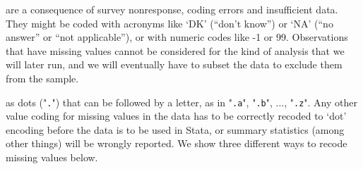  are a consequence of survey nonresponse, coding errors and insufficient data. They might be coded with acronyms like `DK' (``don't know'') or `NA' (``no answer'' or ``not applicable''), or with numeric codes like -1 or 99. Observations that have missing values cannot be considered for the kind of analysis that we will later run, and we will eventually have to subset the data to exclude them from the sample.

 as dots ("\texttt{.}") that can be followed by a letter, as in "\texttt{.a}", "\texttt{.b}", ..., "\texttt{.z}". Any other value coding for missing values in the data has to be correctly recoded to `dot' encoding before the data is to be used in Stata, or summary statistics (among other things) will be wrongly reported. We show three different ways to recode missing values below.


